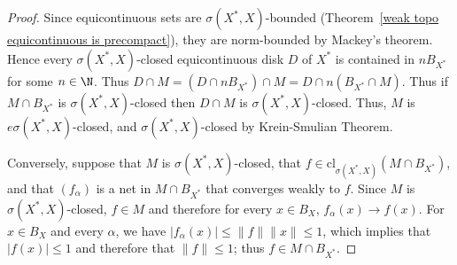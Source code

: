 \begin{proof}
Since equicontinuous sets are $\sigma(X^*,X)$-bounded (Theorem~\ref{weak topo equicontinuous is precompact}), they are norm-bounded by Mackey's theorem. Hence every $\sigma(X^*,X)$-closed equicontinuous disk $D$ of $X^*$ is contained in $nB_{X^*}$ for some $n\in\N$. Thus $D\cap M=(D\cap nB_{X^*})\cap M=D\cap n(B_{X^*}\cap M)$. Thus if $M\cap B_{X^*}$ is $\sigma(X^*,X)$-closed then $D\cap M$ is $\sigma(X^*,X)$-closed. Thus, $M$ is $e\sigma(X^*,X)$-closed, and $\sigma(X^*,X)$-closed by Krein-Smulian Theorem.\par
Conversely, suppose that $M$ is $\sigma(X^*,X)$-closed, that $f\in\mathrm{cl}_{\sigma(X^*,X)}(M\cap B_{X^*})$, and that $(f_\alpha)$ is a net in $M\cap B_{X^*}$ that converges weakly to $f$. Since $M$ is $\sigma(X^*,X)$-closed, $f\in M$ and therefore for every $x\in B_X$, $f_\alpha(x)\to f(x)$. For $x\in B_X$ and every $\alpha$, we have $|f_\alpha(x)|\leq\|f\|\|x\|\leq 1$, which implies that $|f(x)|\leq 1$ and therefore that $\|f\|\leq 1$; thus $f\in M\cap B_{X^*}$.
\end{proof}
